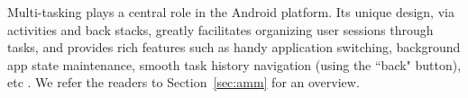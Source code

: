 

Multi-tasking plays a central role in the Android platform. %
%
Its unique design, via activities and back stacks, greatly facilitates organizing user sessions through tasks, and provides rich features such as handy application switching, background app state maintenance, smooth task history navigation (using the ``back" button), etc \cite{RZXWL15}. We refer the readers to Section~\ref{sec:amm} for an overview. 

